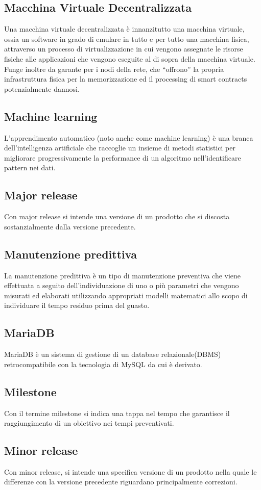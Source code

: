 \subsection{Macchina Virtuale Decentralizzata}  Una macchina virtuale decentralizzata è innanzitutto una macchina virtuale, ossia un software in grado di emulare in tutto e per tutto una macchina fisica, attraverso un processo di virtualizzazione in cui vengono assegnate le risorse fisiche alle applicazioni che vengono eseguite al di sopra della macchina virtuale. Funge inoltre da garante per i nodi della rete, che “offrono” la propria infrastruttura fisica per la memorizzazione ed il processing di smart contracts potenzialmente dannosi.
\subsection{Machine learning}  L’apprendimento automatico (noto anche come machine learning) è una branca dell'intelligenza artificiale che raccoglie un insieme di metodi statistici per migliorare progressivamente la performance di un algoritmo nell'identificare pattern nei dati. 
\subsection{Major release}  Con major release si intende una versione di un prodotto che si discosta sostanzialmente dalla versione precedente.
\subsection{Manutenzione predittiva}  La manutenzione predittiva è un tipo di manutenzione preventiva che viene effettuata a seguito dell'individuazione di uno o più parametri che vengono misurati ed elaborati utilizzando appropriati modelli matematici allo scopo di individuare il tempo residuo prima del guasto.
\subsection{MariaDB}  MariaDB è un sistema di gestione di un database relazionale(DBMS) retrocompatibile con la tecnologia di MySQL da cui è derivato.
\subsection{Milestone}  Con il termine milestone si indica una tappa nel tempo che garantisce il raggiungimento di un obiettivo nei tempi preventivati.
\subsection{Minor release}   Con minor release, si intende una specifica versione di un prodotto nella quale le differenze con la versione precedente riguardano principalmente correzioni.
